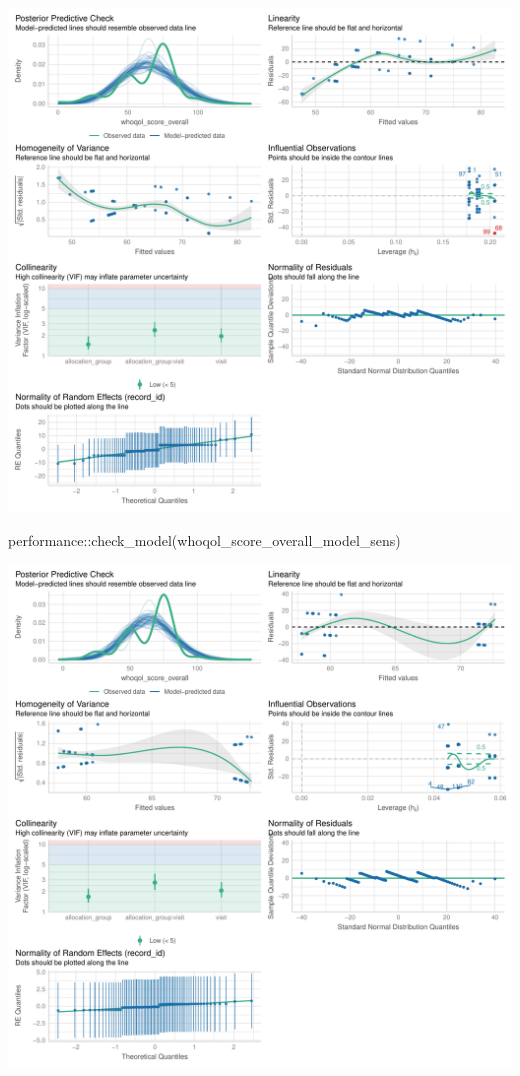 \documentclass[
  letterpaper,
  DIV=11,
  numbers=noendperiod]{scrartcl}
\newenvironment{Shaded}{\begin{snugshade}}{\end{snugshade}}
\newcommand{\FunctionTok}[1]{\textcolor[rgb]{0.28,0.35,0.67}{#1}}
\newcommand{\NormalTok}[1]{\textcolor[rgb]{0.00,0.23,0.31}{#1}}
\newcommand{\SpecialCharTok}[1]{\textcolor[rgb]{0.37,0.37,0.37}{#1}}
\begin{document}
\includegraphics{Outcomes_V1V2V3_files/figure-pdf/whoqol_score_overall_4-1.pdf}

\begin{Shaded}
\begin{Highlighting}[]
\NormalTok{performance}\SpecialCharTok{::}\FunctionTok{check\_model}\NormalTok{(whoqol\_score\_overall\_model\_sens)}
\end{Highlighting}
\end{Shaded}

\includegraphics{Outcomes_V1V2V3_files/figure-pdf/whoqol_score_overall_4-2.pdf}
\end{document}
